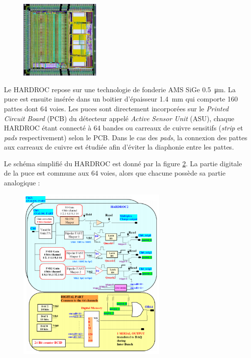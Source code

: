 \begin{figure}[ht!]
	\centering
	\includegraphics[width=0.35\textwidth]{GLA/HARDROC.png}
	\label{hardroc}
\end{figure}

Le HARDROC repose sur une technologie de fonderie AMS SiGe \SI{0.5}{\micro\meter}. La puce est ensuite insérée dans un boitier d'épaisseur \SI{1.4}{\milli\meter} qui comporte \num{160} pattes dont \num{64} voies. Les puces sont directement incorporées sur le \textit{Printed Circuit Board} (PCB) du détecteur appelé \textit{Active Sensor Unit} (ASU), chaque HARDROC étant connecté à \num{64} bandes ou carreaux de cuivre sensitifs (\textit{strip} et \textit{pads} respectivement) selon le PCB. Dans le cas des \textit{pads}, la connexion des pattes aux carreaux de cuivre est étudiée afin d'éviter la diaphonie entre les pattes.

Le schéma simplifié du HARDROC est donné par la figure \ref{scheme}. La partie digitale de la puce est commune aux \num{64} voies, alors que chacune possède sa partie analogique :

\begin{figure}[ht!]
	\centering
	\includegraphics[width=0.65\textwidth]{GLA/scheme.png}
	\label{scheme}
\end{figure}

